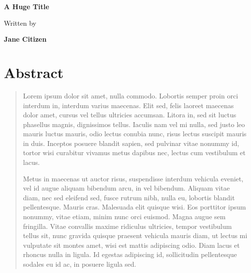 %
%

%
%
%
%

\begin{titlepage}
  \normalfont\rmfamily\Large%
  \mbox{}

  \vfill{}

  \begin{center}
    \bfseries\Huge%
    A Huge Title
  \end{center}

  \bigskip{}

  \begin{center}
    Written by
  \end{center}

  \bigskip{}

  \begin{center}
    \bfseries%
    Jane Citizen
  \end{center}

  \vfill{}

  \mbox{}
\end{titlepage}

%
%
%
%

\tableofcontents{}

%
%
%
%

\chapter*{Abstract}
\label{cha:example-front-matter:abstr}

\vspace{4\baselineskip}

\begin{quote}
  Lorem ipsum dolor sit amet, nulla commodo. Lobortis semper proin orci
  interdum in, interdum varius maecenas. Elit sed, felis laoreet
  maecenas dolor amet, cursus vel tellus ultricies accumsan. Litora in,
  sed sit luctus phasellus magnis, dignissimos tellus. Iaculis nam vel
  mi nulla, sed justo leo mauris luctus mauris, odio lectus conubia
  nunc, risus lectus suscipit mauris in duis. Inceptos posuere blandit
  sapien, sed pulvinar vitae nonummy id, tortor wisi curabitur vivamus
  metus dapibus nec, lectus cum vestibulum et lacus.

  Metus in maecenas ut auctor risus, suspendisse interdum vehicula
  eveniet, vel id augue aliquam bibendum arcu, in vel bibendum. Aliquam
  vitae diam, nec sed eleifend sed, fusce rutrum nibh, nulla eu,
  lobortis blandit pellentesque. Mauris cras. Malesuada elit quisque
  wisi. Eos porttitor ipsum nonummy, vitae etiam, minim nunc orci
  euismod. Magna augue sem fringilla. Vitae convallis maxime ridiculus
  ultricies, tempor vestibulum tellus sit, nunc gravida quisque praesent
  vehicula mauris diam, ut lectus mi vulputate sit montes amet, wisi est
  mattis adipiscing odio. Diam lacus et rhoncus nulla in ligula. Id
  egestas adipiscing id, sollicitudin pellentesque sodales eu id ac, in
  posuere ligula sed.
\end{quote}

